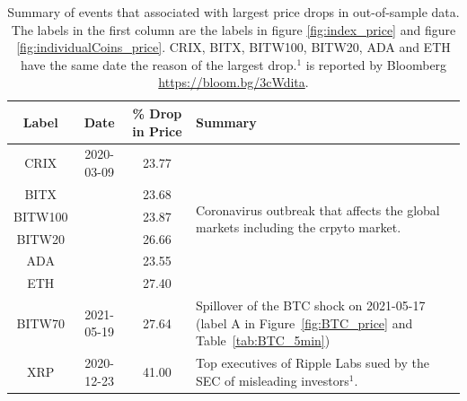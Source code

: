 \begin{table}[t]
    \centering
      \begin{tabularx}{.8\textwidth}{cccX}
        \toprule
        Label &  Date & \% Drop in Price &  Summary\\
        \midrule
        CRIX    &2020-03-09 & 23.77 &
        \multirow[t]{6}{\hsize}{Coronavirus outbreak that affects the
          global markets including the crpyto market.}\\ 
        BITX    & & 23.68 &  \\
        BITW100 & & 23.87 &  \\
        BITW20  & & 26.66 &  \\
        ADA     & &23.55 &  \\
        ETH     & &27.40 &  \\
        BITW70  & 2021-05-19& 27.64 & Spillover of the BTC shock on
        2021-05-17 (label A in Figure~\ref{fig:BTC_price} and
        Table~\ref{tab:BTC_5min})\\ 
        XRP     & 2020-12-23 & 41.00 & Top executives of Ripple Labs
        sued by the SEC of misleading investors$^1$. \\ 
        \bottomrule
      \end{tabularx}
        \caption{Summary of events that associated with largest price drops in out-of-sample data.
        The labels in the first column are the labels in figure \ref{fig:index_price} and figure \ref{fig:individualCoins_price}.
        CRIX, BITX, BITW100, BITW20, ADA and ETH have the same date
        the reason of the largest drop.$^1$ is reported by Bloomberg
        \url{https://bloom.bg/3cWdita}.} 
        \label{tab:All_min}
  \end{table}

